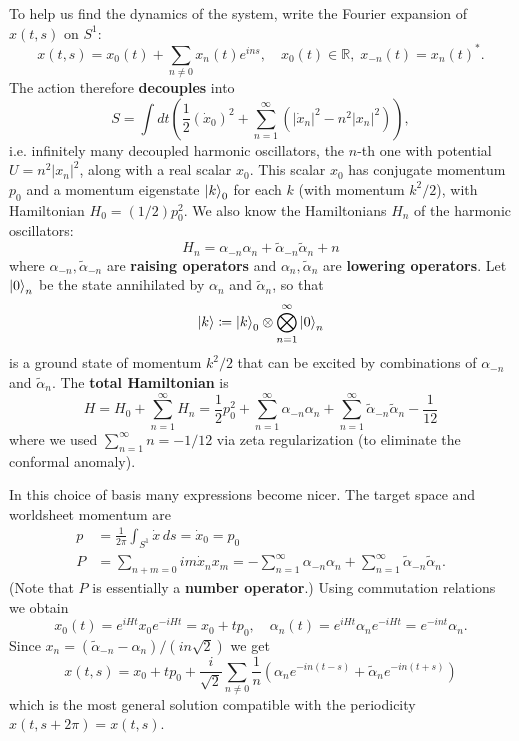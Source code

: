 \documentclass{report}
\theoremstyle{plain}
\theoremstyle{definition}
\theoremstyle{remark}
\newcommand{\bR}{\mathbb{R}}
\begin{document}
To help us find the dynamics of the system, write the Fourier
expansion of $x(t, s)$ on $S^1$:
\[ x(t, s) = x_0(t) + \sum_{n \neq 0} x_n(t) e^{ins}, \quad x_0(t) \in \bR, \; x_{-n}(t) = x_n(t)^*. \]
The action therefore {\bf decouples} into
\[ S = \int dt \left(\frac{1}{2}(\dot x_0)^2 + \sum_{n=1}^\infty (|\dot x_n|^2 - n^2 |x_n|^2)\right), \]
i.e. infinitely many decoupled harmonic oscillators, the $n$-th one
with potential $U = n^2|x_n|^2$, along with a real scalar $x_0$. This
scalar $x_0$ has conjugate momentum $p_0$ and a momentum eigenstate
$\ket{k}_0$ for each $k$ (with momentum $k^2/2$), with Hamiltonian
$H_0 = (1/2)p_0^2$. We also know the Hamiltonians $H_n$ of the
harmonic oscillators:
\[ H_n = \alpha_{-n}\alpha_n + \tilde{\alpha}_{-n}\tilde{\alpha}_n + n \]
where $\alpha_{-n}, \tilde{\alpha}_{-n}$ are {\bf raising operators}
and $\alpha_n, \tilde{\alpha}_n$ are {\bf lowering operators}. Let
$\ket{0}_n$ be the state annihilated by $\alpha_n$ and
$\tilde{\alpha}_n$, so that
\[ \ket{k} \coloneqq \ket{k}_0 \otimes \bigotimes_{n=1}^\infty \ket{0}_n \]
is a ground state of momentum $k^2/2$ that can be excited by
combinations of $\alpha_{-n}$ and $\tilde{\alpha}_n$. The {\bf total
  Hamiltonian} is
\[ H = H_0 + \sum_{n=1}^\infty H_n = \frac{1}{2}p_0^2 + \sum_{n=1}^\infty \alpha_{-n}\alpha_n + \sum_{n=1}^\infty \tilde{\alpha}_{-n}\tilde{\alpha}_n - \frac{1}{12} \]
where we used $\sum_{n=1}^\infty n = -1/12$ via zeta regularization
(to eliminate the conformal anomaly).

In this choice of basis many expressions become nicer. The target
space and worldsheet momentum are
\begin{align*}
  p &= \frac{1}{2\pi} \int_{S^1} \dot x \, ds = \dot x_0 = p_0 \\
  P &= \sum_{n+m=0} im \dot x_n x_m = -\sum_{n=1}^\infty \alpha_{-n}\alpha_n + \sum_{n=1}^\infty \tilde\alpha_{-n}\tilde\alpha_n.
\end{align*}
(Note that $P$ is essentially a {\bf number operator}.) Using
commutation relations we obtain 
\[ x_0(t) = e^{iHt}x_0 e^{-iHt} = x_0 + tp_0, \quad \alpha_n(t) = e^{iHt} \alpha_n e^{-iHt} = e^{-int}\alpha_n. \]
Since $x_n = (\tilde\alpha_{-n} - \alpha_n)/(in\sqrt{2})$ we get
\[ x(t, s) = x_0 + tp_0 + \frac{i}{\sqrt{2}} \sum_{n \neq 0} \frac{1}{n} (\alpha_n e^{-in(t-s)} + \tilde\alpha_n e^{-in(t+s)}) \]
which is the most general solution compatible with the periodicity
$x(t, s+2\pi) = x(t,s)$.
\end{document}
